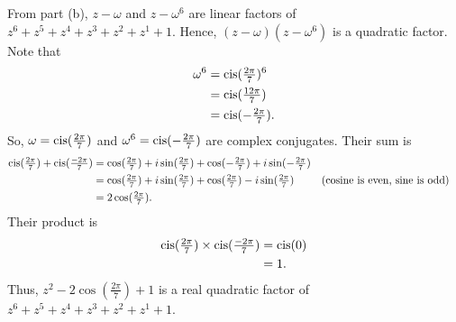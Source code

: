 \begin{parts}
\begin{EnvFullwidth}
\begin{solutionorgrid}[4in]
From part (b), $z - \omega$ and $z - \omega^6$ are linear factors of $z^6 + z^5 + z^4 + z^3 + z^2 + z^1 + 1$. Hence, $(z - \omega)(z - \omega^6)$ is a quadratic factor. Note that
\begin{align*}
	\omega^6 &= \operatorname{cis}(\tfrac{2\pi}{7})^6 \\
	&= \operatorname{cis}(\tfrac{12\pi}{7}) \\
	&= \operatorname{cis}(-\tfrac{2\pi}{7}).
\end{align*}
So, $\omega = \operatorname{cis}(\frac{2\pi}{7})$ and $\omega^6 = \operatorname{cis}(-\frac{2\pi}{7})$ are complex conjugates. Their sum is
\begin{align*}
	\operatorname{cis}(\tfrac{2\pi}{7}) + \operatorname{cis}(\tfrac{-2\pi}{7}) &= \cos(\tfrac{2\pi}{7}) + i \sin(\tfrac{2\pi}{7}) + \cos(-\tfrac{2\pi}{7}) + i \sin(-\tfrac{2\pi}{7}) \\
	&= \cos(\tfrac{2\pi}{7}) + i \sin(\tfrac{2\pi}{7}) + \cos(\tfrac{2\pi}{7}) - i \sin(\tfrac{2\pi}{7}) && (\textrm{cosine is even, sine is odd}) \\
	&= 2\cos(\tfrac{2\pi}{7}).
\end{align*}
Their product is
\begin{align*}
	\operatorname{cis}(\tfrac{2\pi}{7}) \times \operatorname{cis}(\tfrac{-2\pi}{7}) &= \operatorname{cis}(0) \\
	&= 1.
\end{align*}
Thus, $z^2 - 2\cos(\frac{2\pi}{7}) + 1$ is a real quadratic factor of $z^6 + z^5 + z^4 + z^3 + z^2 + z^1 + 1$.
\end{solutionorgrid}
\end{EnvFullwidth}

\end{parts}
